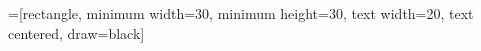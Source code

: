 \newcommand{\keta}[2][]{\vert {#2} \rangle_{#1}}
\newcommand{\braketa}[3][]{\langle {#2} \vert {#3}\rangle_{#1}}

=[rectangle, minimum width=30, minimum height=30, text width=20, text centered, draw=black]